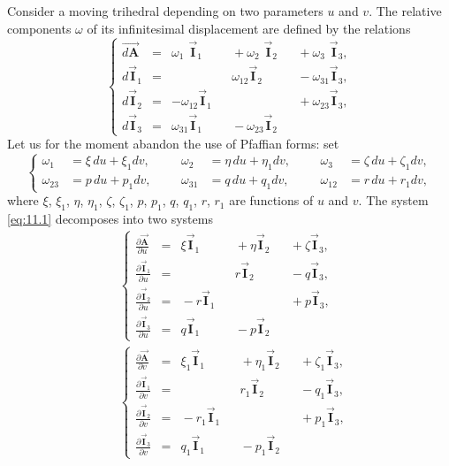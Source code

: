\documentclass[leqno,11pt]{book}
\numberwithin{equation}{chapter}
\newcommand{\pd}{\partial}
\theoremstyle{shape1}
\theoremstyle{shapesmall}
\newcommand{\rvec}[1]{\vec{\mathbf{#1}}}
\newcommand{\ivec}{\rvec{I}}
\begin{document}
Consider a moving trihedral depending on two parameters $u$ and $v$. The relative components $\omega$ of its infinitesimal displacement are defined by the relations
\begin{equation}
  \label{eq:11.1}
  \left\{
    \begin{alignedat}{20}
      \overrightarrow{d\mathbf{A}}&{}={}&\omega_{1\phantom{0}}\ivec_{1}&&{}+{}\omega_{2\phantom{0}}\ivec_{2}&&{}+{}\omega_{3\phantom{0}}\ivec_{3},\\
      d\ivec_{1}&{}={}&&&\omega_{12}\ivec_{2}&&{}-{}\omega_{31}\ivec_{3},\\
      d\ivec_{2}&{}={}&-\omega_{12}\ivec_{1}&&&&{}+{}\omega_{23}\ivec_{3},\\
      d\ivec_{3}&{}={}&\omega_{31}\ivec_{1}&&{}-{}\omega_{23}\ivec_{2}
    \end{alignedat}
  \right.
\end{equation}
Let us for the moment abandon the use of Pfaffian forms: set
\begin{equation}
  \label{eq:11.2}
  \left\{
    \begin{aligned}
      \omega_{1\phantom{0}}&=\xi\,du+\xi_{1}dv,&&&\omega_{2\phantom{0}}&=\eta\,du+\eta_{1}dv,&&&\omega_{3\phantom{0}}&=\zeta\,du+\zeta_{1}dv,\\
      \omega_{23}&=p\,du+p_{1}dv,&&&\omega_{31}&=q\,du+q_{1}dv,&&&\omega_{12}&=r\,du+r_{1}dv,
    \end{aligned}
  \right.
\end{equation}
where $\xi$, $\xi_{1}$, $\eta$, $\eta_{1}$, $\zeta$, $\zeta_{1}$, $p$, $p_{1}$, $q$, $q_{1}$, $r$, $r_{1}$ are functions of $u$ and $v$. The system \eqref{eq:11.1} decomposes into two systems
\begin{align}
  \label{eq:11.3}
  &  \left\{
    \begin{alignedat}{20}
      \frac{\pd\vec{\mathbf{A}}}{\pd u}&{}={}&\xi\ivec_{1}&&{}+{}\eta\ivec_{2}&&{}+{}\zeta\ivec_{3},\\
      \frac{\pd\ivec_{1}}{\pd u}&{}={}&&&r\ivec_{2}&&{}-{}q\ivec_{3},\\
      \frac{\pd\ivec_{2}}{\pd u}&{}={}&{}-{}r\ivec_{1}&&&&{}+{}p\ivec_{3},\\
      \frac{\pd\ivec_{3}}{\pd u}&{}={}&q\ivec_{1}&&{}-{}p\ivec_{2}
    \end{alignedat}
  \right.
  \\
  \label{eq:11.4}
  &  \left\{
    \begin{alignedat}{20}
      \frac{\pd\vec{\mathbf{A}}}{\pd v}&{}={}&\xi_{1}\ivec_{1}&&{}+{}\eta_{1}\ivec_{2}&&{}+{}\zeta_{1}\ivec_{3},\\
      \frac{\pd\ivec_{1}}{\pd v}&{}={}&&&r_{1}\ivec_{2}&&{}-{}q_{1}\ivec_{3},\\
      \frac{\pd\ivec_{2}}{\pd v}&{}={}&{}-{}r_{1}\ivec_{1}&&&&{}+{}p_{1}\ivec_{3},\\
      \frac{\pd\ivec_{3}}{\pd v}&{}={}&q_{1}\ivec_{1}&&{}-{}p_{1}\ivec_{2}
    \end{alignedat}
  \right.
\end{align}
\end{document}

